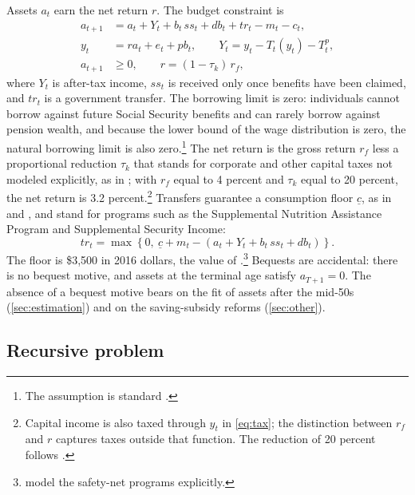 Assets $a_t$ earn the net return $r$. The budget constraint is
\begin{equation}\label{eq:budget}
\begin{aligned}
a_{t+1}&=a_t+Y_t+b_t\,ss_t+db_t+tr_t-m_t-c_t,\\
y_t&=r a_t+e_t+pb_t,\qquad Y_t=y_t-T_t(y_t)-T^p_t,\\
a_{t+1}&\geq 0,\qquad r=(1-\tau_k)\,r_f ,
\end{aligned}
\end{equation}
where $Y_t$ is after-tax income, $ss_t$ is received only once benefits have been claimed, and $tr_t$ is a government transfer. The borrowing limit is zero: individuals cannot borrow against future Social Security benefits and can rarely borrow against pension wealth, and because the lower bound of the wage distribution is zero, the natural borrowing limit is also zero.\footnote{The assumption is standard \citep[e.g.,][]{Hubbard1995,Zeldes1989}.} %
The net return is the gross return $r_f$ less a proportional reduction $\tau_k$ that stands for corporate and other capital taxes not modeled explicitly, as in \citet{Stantcheva2017}; with $r_f$ equal to 4 percent \citep{french2005effects} and $\tau_k$ equal to 20 percent, the net return is 3.2 percent.\footnote{Capital income is also taxed through $y_t$ in \eqref{eq:tax}; the distinction between $r_f$ and $r$ captures taxes outside that function. The reduction of 20 percent follows \citet{Stantcheva2017}.} %
Transfers guarantee a consumption floor $\underline{c}$, as in \citet{Hubbard1995} and \citet{Denardi2010}, and stand for programs such as the Supplemental Nutrition Assistance Program and Supplemental Security Income:
\begin{equation}\label{eq:transfer}
tr_t=\max\left\{0,\ \underline{c}+m_t-\left(a_t+Y_t+b_t\,ss_t+db_t\right)\right\}.
\end{equation}
The floor is \$3,500 in 2016 dollars, the value of \citet{french2011effects}.\footnote{\citet{Braun2017} model the safety-net programs explicitly.} %
Bequests are accidental: there is no bequest motive, and assets at the terminal age satisfy $a_{T+1}=0$. %
The absence of a bequest motive bears on the fit of assets after the mid-50s (\autoref{sec:estimation}) and on the saving-subsidy reforms (\autoref{sec:other}). %

\subsection{Recursive problem}\label{subsec:recursive}

